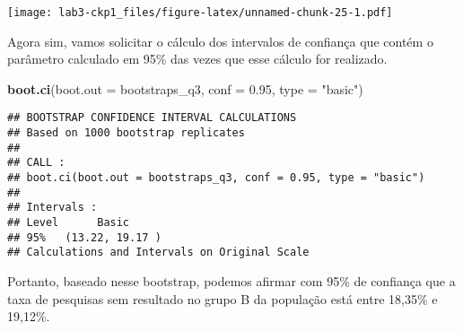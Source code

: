 \documentclass[]{article}
\newenvironment{Shaded}{\begin{snugshade}}{\end{snugshade}}
\newcommand{\KeywordTok}[1]{\textcolor[rgb]{0.13,0.29,0.53}{\textbf{#1}}}
\newcommand{\DataTypeTok}[1]{\textcolor[rgb]{0.13,0.29,0.53}{#1}}
\newcommand{\DecValTok}[1]{\textcolor[rgb]{0.00,0.00,0.81}{#1}}
\newcommand{\FloatTok}[1]{\textcolor[rgb]{0.00,0.00,0.81}{#1}}
\newcommand{\StringTok}[1]{\textcolor[rgb]{0.31,0.60,0.02}{#1}}
\newcommand{\OperatorTok}[1]{\textcolor[rgb]{0.81,0.36,0.00}{\textbf{#1}}}
\newcommand{\NormalTok}[1]{#1}
\begin{document}
\begin{Shaded}
\end{Shaded}

\texttt{[image: lab3-ckp1\_files/figure-latex/unnamed-chunk-25-1.pdf]}

Agora sim, vamos solicitar o cálculo dos intervalos de confiança que
contém o parâmetro calculado em 95\% das vezes que esse cálculo for
realizado.

\begin{Shaded}
\begin{Highlighting}[]
\KeywordTok{boot.ci}\NormalTok{(}\DataTypeTok{boot.out =}\NormalTok{ bootstraps_q3, }\DataTypeTok{conf =} \FloatTok{0.95}\NormalTok{, }\DataTypeTok{type =} \StringTok{"basic"}\NormalTok{)}
\end{Highlighting}
\end{Shaded}

\begin{verbatim}
## BOOTSTRAP CONFIDENCE INTERVAL CALCULATIONS
## Based on 1000 bootstrap replicates
## 
## CALL : 
## boot.ci(boot.out = bootstraps_q3, conf = 0.95, type = "basic")
## 
## Intervals : 
## Level      Basic         
## 95%   (13.22, 19.17 )  
## Calculations and Intervals on Original Scale
\end{verbatim}

Portanto, baseado nesse bootstrap, podemos afirmar com 95\% de confiança
que a taxa de pesquisas sem resultado no grupo B da população está entre
18,35\% e 19,12\%.
\end{document}
